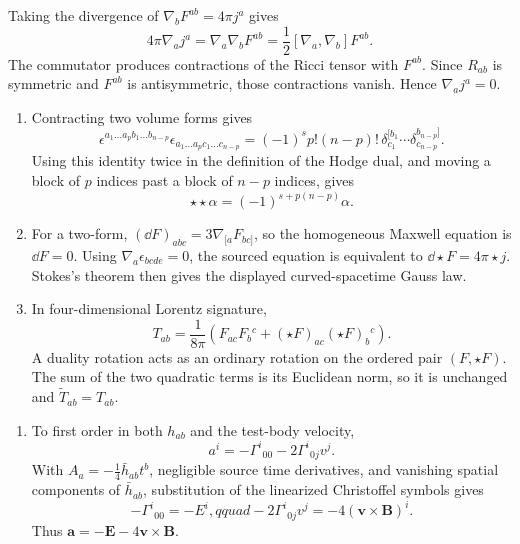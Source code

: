 \ExerciseEditorialNote

\begin{enumerate}[leftmargin=2.8em,itemsep=1.2em]
Taking the divergence of \(\nabla_bF^{ab}=4\pi j^a\) gives
\[
 4\pi\nabla_aj^a=\nabla_a\nabla_bF^{ab}
 =\frac12[\nabla_a,\nabla_b]F^{ab}.
\]
The commutator produces contractions of the Ricci tensor with \(F^{ab}\).
Since \(R_{ab}\) is symmetric and \(F^{ab}\) is antisymmetric, those
contractions vanish.  Hence \(\nabla_aj^a=0\).

\begin{enumerate}[label=\alph*),leftmargin=2em]
\item Contracting two volume forms gives
\[
 \epsilon^{a_1\ldots a_pb_1\ldots b_{n-p}}
 \epsilon_{a_1\ldots a_pc_1\ldots c_{n-p}}
 =(-1)^s p!(n-p)!\,
 \delta^{[b_1}_{c_1}\cdots\delta^{b_{n-p}]}_{c_{n-p}}.
\]
Using this identity twice in the definition of the Hodge dual, and moving a
block of \(p\) indices past a block of \(n-p\) indices, gives
\[
 \star\star\alpha=(-1)^{s+p(n-p)}\alpha.
\]

\item For a two-form,
\((\dd F)_{abc}=3\nabla_{[a}F_{bc]}\), so the homogeneous Maxwell equation is
\(\dd F=0\).  Using \(\nabla_a\epsilon_{bcde}=0\), the sourced equation is
equivalent to
\(\dd\star F=4\pi\star j\).  Stokes's theorem then gives the displayed
curved-spacetime Gauss law.

\item In four-dimensional Lorentz signature,
\[
 T_{ab}=\frac{1}{8\pi}
 \left(F_{ac}F_b{}^c+(\star F)_{ac}(\star F)_b{}^c\right).
\]
A duality rotation acts as an ordinary rotation on the ordered pair
\((F,\star F)\).  The sum of the two quadratic terms is its Euclidean norm,
so it is unchanged and \(\widetilde T_{ab}=T_{ab}\).
\end{enumerate}

\begin{enumerate}[label=\alph*),leftmargin=2em]
\item To first order in both \(h_{ab}\) and the test-body velocity,
\[
 a^i=-\Gamma^i{}_{00}-2\Gamma^i{}_{0j}v^j.
\]
With \(A_a=-\tfrac14\bar h_{ab}t^b\), negligible source time derivatives,
and vanishing spatial components of \(\bar h_{ab}\), substitution of the
linearized Christoffel symbols gives
\[
 -\Gamma^i{}_{00}=-E^i,qquad
 -2\Gamma^i{}_{0j}v^j=-4(\mathbf v\mathbin\times\mathbf B)^i.
\]
Thus \(\mathbf a=-\mathbf E-4\mathbf v\mathbin\times\mathbf B\).


\end{enumerate}
\end{enumerate}
